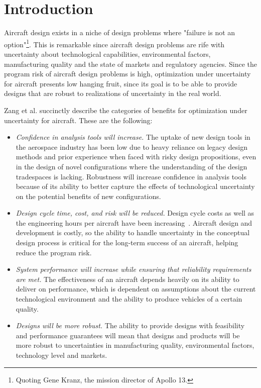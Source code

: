 \section{Introduction}

Aircraft design exists in a niche of design problems where "failure is
not an option"\footnote{Quoting Gene Kranz, the mission director of Apollo 13.}.
This is remarkable since aircraft design problems are rife with uncertainty about
technological capabilities, environmental factors, manufacturing quality and the
state of markets and regulatory agencies. Since the program risk of aircraft design
problems is high, optimization under uncertainty for aircraft presents
low hanging fruit, since its goal is to be able to provide designs that are robust
to realizations of uncertainty in the real world.

Zang et al.\cite{Zang2002} succinctly describe the categories of benefits for optimization under uncertainty for aircraft.
These are the following:
\begin{itemize}
    \item \emph{Confidence in analysis tools will increase.}
    The uptake of new design tools in the aerospace industry has been low
    due to heavy reliance on legacy design methods and prior experience when
    faced with risky design propositions,
    even in the design of novel configurations where the understanding
    of the design tradespaces is lacking. Robustness will increase
    confidence in analysis tools because of its ability to better capture the
    effects of technological uncertainty on the potential benefits of new
    configurations.
    \item \emph{Design cycle time, cost, and risk will be reduced.}
    Design cycle costs as well as the engineering hours per aircraft have been increasing~\cite{Patt2012}.
    Aircraft design and development is costly, so the ability to handle uncertainty in
    the conceptual design process is critical for the long-term success of an aircraft,
    helping reduce the program risk.
    \item \emph{System performance will increase while ensuring that reliability requirements
    are met.}
    The effectiveness of an aircraft depends heavily on its
    ability to deliver on performance, which is dependent on assumptions about the
    current technological environment and the ability to produce vehicles of a certain quality.
    \item \emph{Designs will be more robust.}
    The ability to provide designs with feasibility and performance guarantees will mean
    that designs and products will be more robust to uncertainties in manufacturing quality,
    environmental factors, technology level and markets.
\end{itemize}

